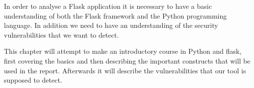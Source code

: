 In order to analyse a Flask application it is necessary to have a basic understanding of both the Flask framework and the Python programming language.
In addition we need to have an understanding of the security vulnerabilities that we want to detect.

This chapter will attempt to make an introductory course in Python and flask, first covering the basics and then describing the important constructs that will be used in the report.
Afterwards it will describe the vulnerabilities that our tool is supposed to detect.
